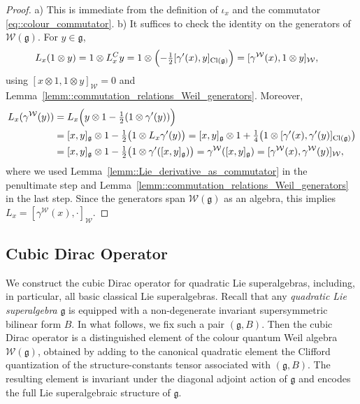 \documentclass[11pt]{amsart}
\def\WW{{\mathcal{W}}}
\def\Weil{{\mathcal{W}(\gg)}}
\def\Cl{{\operatorname{Cl}}}
\def\gg{{\mathfrak{g}}}
\theoremstyle{plain}
\theoremstyle{remark}
\theoremstyle{definition}
\numberwithin{equation}{section}
\theoremstyle{remark}
\begin{document}
\begin{proof}
a) This is immediate from the definition of $\iota_x$ and the commutator \eqref{eq::colour_commutator}.
b) It suffices to check the identity on the generators of $\Weil$. For $y\in\gg$,
\[
\begin{split}
L_x(1\otimes y)
&=1\otimes L^{C}_x y
=1\otimes\Bigl(-\tfrac12[\gamma'(x),y]_{\Cl(\gg)}\Bigr)
=[\gamma^{\WW}(x),1\otimes y]_{\WW},
\end{split}
\]
using $[x\otimes 1,1\otimes y]_{\WW}=0$ and Lemma~\ref{lemm::commutation_relations_Weil_generators}. Moreover,
\[
\begin{split}
L_x(\gamma^{\WW}(y))
&=L_x\Bigl(y\otimes 1-\tfrac12(1\otimes \gamma'(y))\Bigr)\\
&=[x,y]_{\gg}\otimes 1-\tfrac12\bigl(1\otimes L_x\gamma'(y)\bigr)
=[x,y]_{\gg}\otimes 1+\tfrac14\bigl(1\otimes[\gamma'(x),\gamma'(y)]_{\Cl(\gg)}\bigr)\\
&=[x,y]_{\gg}\otimes 1-\tfrac12\bigl(1\otimes \gamma'([x,y]_{\gg})\bigr)
=\gamma^{\WW}([x,y]_{\gg})
=[\gamma^{\WW}(x),\gamma^{\WW}(y)]_{\WW},
\end{split}
\]
where we used Lemma~\ref{lemm::Lie_derivative_as_commutator} in the penultimate step and
Lemma~\ref{lemm::commutation_relations_Weil_generators} in the last step. Since the generators span $\Weil$ as an algebra, this
implies $L_x=[\gamma^{\WW}(x),\cdot]_{\WW}$.
\end{proof}

\subsection{Cubic Dirac Operator}
We construct the cubic Dirac operator for quadratic Lie superalgebras, including, in particular, all basic classical Lie superalgebras. Recall that any \emph{quadratic Lie superalgebra} $\gg$ is equipped with a non-degenerate invariant supersymmetric bilinear form $B$. In what follows, we fix such a pair $(\gg,B)$. Then the cubic Dirac operator is a distinguished element of the colour quantum Weil algebra $\mathcal{W}(\gg)$, obtained by adding to the canonical quadratic element the Clifford quantization of the structure-constants tensor associated with $(\gg,B)$. The resulting element is invariant under the diagonal adjoint action of $\gg$ and encodes the full Lie superalgebraic structure of $\gg$. 
\end{document}
